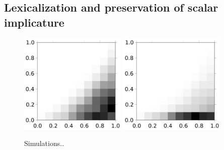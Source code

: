 \documentclass{article} %
\begin{document}



\subsection{Lexicalization and preservation of scalar implicature}


\begin{figure}
\centering
\includegraphics[width=2in]{figures/some-all-only-pragmatic.pdf}
\includegraphics[width=2in]{figures/some-all-pragmatic+unambiguous.pdf}
\caption{\label{fig:scalar} Simulations..}
\end{figure}
\end{document}
